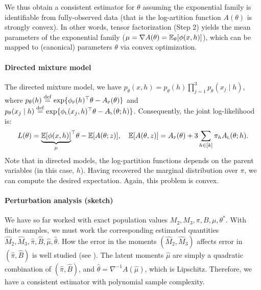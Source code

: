 We thus obtain a consistent estimator for $\theta$ assuming the exponential
family is identifiable from fully-observed data (that is
the log-artition function $A(\theta)$ is strongly convex).
In other words,
tensor factorization (Step 2) yields the mean parameters of the exponential family
($\mu = \nabla A(\theta) = \mathbb{E}_\theta[\phi(x, h)]$),
which can be mapped to (canonical) parameters $\theta$ via convex optimization.

\paragraph{Directed mixture model}

The directed mixture model, we have $p_\theta(x,h) = p_\theta(h) \prod_{j=1}^3 p_\theta(x_j \mid h)$,
where
$p_\theta(h) \stackrel{\rm def}{=} \exp\{\phi_\text{\sc p}(h)^\top\theta - A_\text{\sc p}(\theta)\}$
and
$p_\theta(x_j \mid h) \stackrel{\rm def}{=} \exp\{\phi_\text{\sc l}(x_j, h)^\top\theta - A_\text{\sc l}(\theta; h)\}$.
Consequently, the joint log-likelihood is:
\begin{align}
  L(\theta) = {\underbrace{\mathbb{E}[\phi(x,h)]}_{\mu}}^\top\theta - \mathbb{E}[A(\theta; z)], \quad
  \mathbb{E}[A(\theta, z)] = A_\text{\sc p}(\theta) + 3 \sum_{h \in [k]} \pi_h A_\text{\sc l}(\theta;h).
\end{align}
Note that in directed models, the log-partition functions depends on the parent variables (in this case, $h$).
Having recovered the marginal distribution over $\pi$, we can compute the desired expectation.
Again, this problem is convex.

\paragraph{Perturbation analysis (sketch)}
We have so far worked with exact population values $M_2,M_3,\pi,B,\mu,\theta^*$.
With finite samples, we must work the corresponding estimated quantities $\hat M_2,\hat M_3,\hat\pi,\hat B,\hat\mu,\hat\theta$.
How the error in the moments $(\hat M_2,\hat M_3)$ affects error in $(\hat\pi,\hat B)$ is well studied
(see \citet{anandkumar12moments,anandkumar13tensor}).
The latent moments $\hat\mu$ are simply a quadratic combination of $(\hat\pi,\hat B)$,
and $\hat\theta = \nabla^{-1} A(\hat\mu)$, which is Lipschitz.
Therefore, we have a consistent estimator with polynomial sample complexity.
